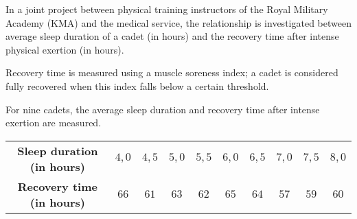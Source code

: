 \begin{enquestion}{22}{
    In a joint project between physical training instructors of the Royal Military Academy (KMA) and the medical service, the relationship is investigated
    between average sleep duration of a cadet (in hours) and the recovery time after intense physical exertion (in hours).
    
    Recovery time is measured using a muscle soreness index; a cadet is considered fully recovered when this index falls below a certain threshold.

    For nine cadets, the average sleep duration and recovery time after intense exertion are measured.
    
    \begin{table}[H]
        \centering
        \begin{tabular}{c|ccccccccc}
            \toprule
                \textbf{Sleep duration (in hours)} & $4,0$ & $4,5$ & $5,0$ & $5,5$ & $6,0$ & $6,5$ & $7,0$ & $7,5$ & $8,0$ \\
                \textbf{Recovery time (in hours)} & $66$ & $61$ & $63$ & $62$ & $65$ & $64$ & $57$ & $59$ & $60$ \\
            \bottomrule
        \end{tabular}
    \end{table}
}
    


\end{enquestion}
